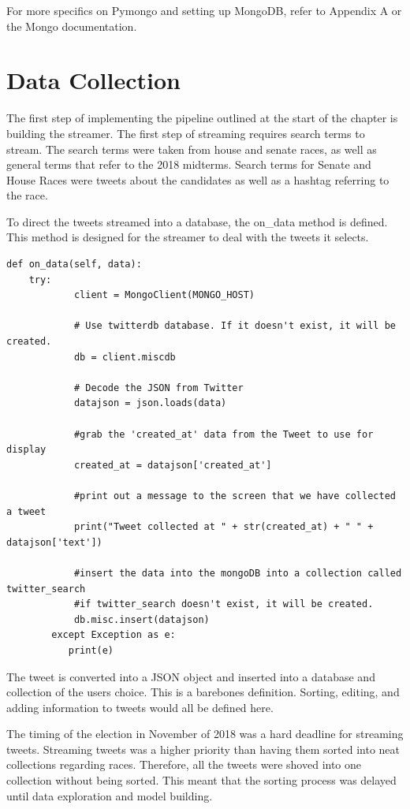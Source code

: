 \documentclass[11pt, twoside, reqno]{book}
\begin{document}
For more specifics on Pymongo and setting up MongoDB, refer to Appendix A or the Mongo documentation\cite{mongo_docs}.

\section{Data Collection}
\hspace{0.2in} 
The first step of implementing the pipeline outlined at the start of the chapter is building the streamer. The first step of streaming requires search terms to stream. The search terms were taken from house and senate races, as well as general terms that refer to the 2018 midterms. Search terms for Senate and House Races were tweets about the candidates as well as a hashtag referring to the race. 

To direct the tweets streamed into a database, the on\_data method is defined. This method is designed for the streamer to deal with the tweets it selects.

\begin{verbatim}
def on_data(self, data):
	try:
            client = MongoClient(MONGO_HOST)

            # Use twitterdb database. If it doesn't exist, it will be created.
            db = client.miscdb

            # Decode the JSON from Twitter
            datajson = json.loads(data)

            #grab the 'created_at' data from the Tweet to use for display
            created_at = datajson['created_at']

            #print out a message to the screen that we have collected a tweet
            print("Tweet collected at " + str(created_at) + " " + datajson['text'])

            #insert the data into the mongoDB into a collection called twitter_search
            #if twitter_search doesn't exist, it will be created.
            db.misc.insert(datajson)
        except Exception as e:
           print(e)
\end{verbatim}

The tweet is converted into a JSON object and inserted into a database and collection of the users choice. This is a barebones definition. Sorting, editing, and adding information to tweets would all be defined here. 

The timing of the election in November of 2018 was a hard deadline for streaming tweets. Streaming tweets was a higher priority than having them sorted into neat collections regarding races. Therefore, all the tweets were shoved into one collection without being sorted. This meant that the sorting process was delayed until data exploration and model building. 
\end{document}

